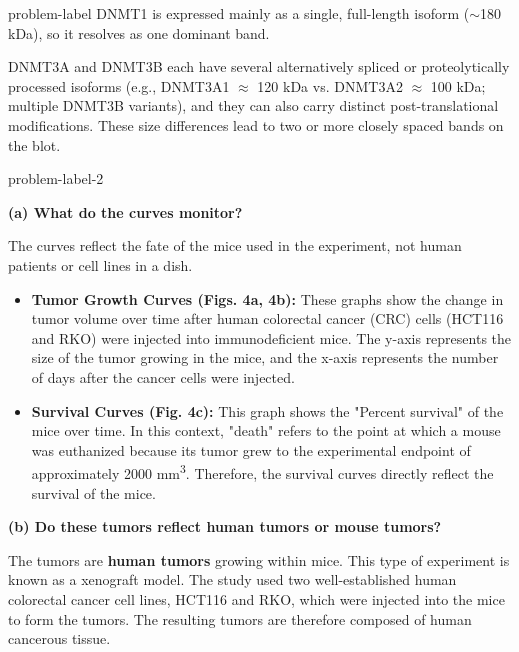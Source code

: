 \begin{multicols}{2}
\begin{problem}{}{problem-label}
    DNMT1 is expressed mainly as a single, full-length isoform ($\sim$180 kDa), so it resolves as one dominant band.

DNMT3A and DNMT3B each have several alternatively spliced or proteolytically processed isoforms (e.g., DNMT3A1 $\approx$ 120 kDa vs. DNMT3A2 $\approx$ 100 kDa; multiple DNMT3B variants), and they can also carry distinct post-translational modifications. These size differences lead to two or more closely spaced bands on the blot.

    
    
\end{problem}



\begin{problem}{}{problem-label-2}

    \textbf{(a) What do the curves monitor?}

The curves reflect the fate of the mice used in the experiment, not human patients or cell lines in a dish.

\begin{itemize}
    \item \textbf{Tumor Growth Curves (Figs. 4a, 4b):} These graphs show the change in tumor volume over time after human colorectal cancer (CRC) cells (HCT116 and RKO) were injected into immunodeficient mice. The y-axis represents the size of the tumor growing in the mice, and the x-axis represents the number of days after the cancer cells were injected.
    \item \textbf{Survival Curves (Fig. 4c):} This graph shows the "Percent survival" of the mice over time. In this context, "death" refers to the point at which a mouse was euthanized because its tumor grew to the experimental endpoint of approximately 2000 mm\textsuperscript{3}. Therefore, the survival curves directly reflect the survival of the mice.
\end{itemize}

\textbf{(b) Do these tumors reflect human tumors or mouse tumors?}

The tumors are \textbf{human tumors} growing within mice. This type of experiment is known as a xenograft model. The study used two well-established human colorectal cancer cell lines, HCT116 and RKO, which were injected into the mice to form the tumors. The resulting tumors are therefore composed of human cancerous tissue.


\end{problem}
\end{multicols}
